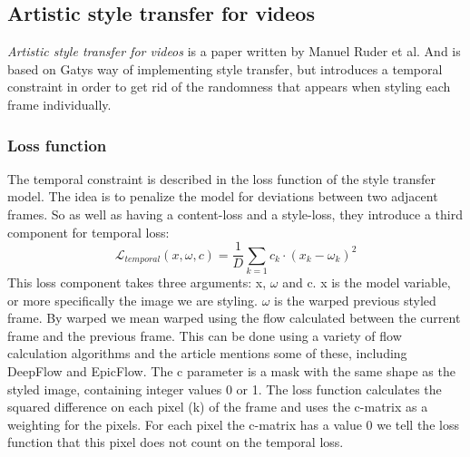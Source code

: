 \subsection{Artistic style transfer for videos}
\textit{Artistic style transfer for videos} is a paper written by Manuel Ruder et al. \cite{Ruder:1} And is based on Gatys \cite{Gatys:1} way of implementing style transfer, but introduces a temporal constraint in order to get rid of the randomness that appears when styling each frame individually. \nextline
\subsubsection{Loss function}
The temporal constraint is described in the loss function of the style transfer model. The idea is to penalize the model for deviations between two adjacent frames. So as well as having a content-loss and a style-loss, they introduce a third component for temporal loss: 
\begin{equation}
\mathcal{L}_{temporal}(x, \omega, c) = \frac{1}{D}\sum_{k=1} c_k \cdot (x_k - \omega_k)^2
\end{equation}
\nextline This loss component takes three arguments: x, $\omega$ and c. x is the model variable, or more specifically the image we are styling. $\omega$ is the warped previous styled frame. By warped we mean warped using the flow calculated between the current frame and the previous frame. This can be done using a variety of flow calculation algorithms and the article mentions some of these, including DeepFlow and EpicFlow. The c parameter is a mask with the same shape as the styled image, containing integer values 0 or 1. The loss function calculates the squared difference on each pixel (k) of the frame and uses the c-matrix as a weighting for the pixels. For each pixel the c-matrix has a value 0 we tell the loss function that this pixel does not count on the temporal loss.

